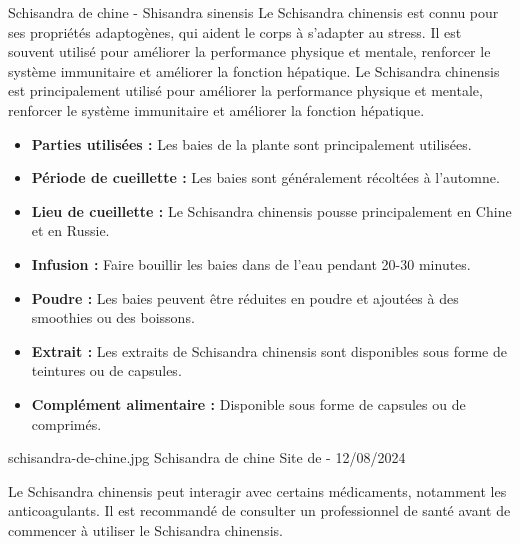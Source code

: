 \ficheidentiteplante
{Schisandra de chine - Shisandra sinensis}
{%
    Le Schisandra chinensis est connu pour ses propriétés adaptogènes, qui aident le corps à s'adapter au stress. Il est souvent utilisé pour améliorer la performance physique et mentale, renforcer le système immunitaire et améliorer la fonction hépatique.
	Le Schisandra chinensis est principalement utilisé pour améliorer la performance physique et mentale, renforcer le système immunitaire et améliorer la fonction hépatique.
 }
{%
    \begin{itemize}[label = \bcplume]
		\item \textbf{Parties utilisées :} Les baies de la plante sont principalement utilisées.
		\item \textbf{Période de cueillette :} Les baies sont généralement récoltées à l'automne.
		\item \textbf{Lieu de cueillette :} Le Schisandra chinensis pousse principalement en Chine et en Russie.
	\end{itemize}
    }

{%
	\begin{itemize}
		\item \textbf{Infusion :} Faire bouillir les baies dans de l'eau pendant 20-30 minutes.
		\item \textbf{Poudre :} Les baies peuvent être réduites en poudre et ajoutées à des smoothies ou des boissons.
		\item \textbf{Extrait :} Les extraits de Schisandra chinensis sont disponibles sous forme de teintures ou de capsules.
		\item \textbf{Complément alimentaire :} Disponible sous forme de capsules ou de comprimés.
	\end{itemize}
}
{%
\begin{multicols}{2}


    \columnbreak


\end{multicols}
}
{%
    schisandra-de-chine.jpg
}
{%
    Schisandra de chine
}
{%
   Site de  - 12/08/2024 
}

\begin{Remarque}
  Le Schisandra chinensis peut interagir avec certains médicaments, notamment les anticoagulants. Il est recommandé de consulter un professionnel de santé avant de commencer à utiliser le Schisandra chinensis.
\end{Remarque}